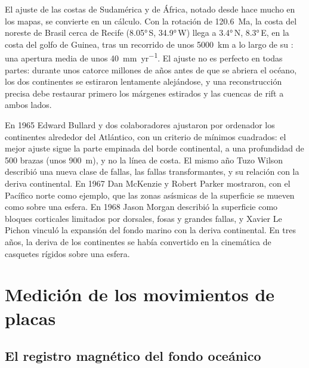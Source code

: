 El ajuste de las costas de Sudamérica y de África, notado desde hace mucho en los mapas, se convierte en un cálculo. Con la rotación de
\qty{120.6}{Ma}, la costa del noreste de Brasil cerca de Recife (\ang{8.05}\,S, \ang{34.9}\,W) llega a \ang{3.4}\,N, \ang{8.3}\,E, en la
costa del golfo de Guinea, tras un recorrido de unos \qty{5000}{km} a lo largo de su : una apertura media de unos
\qty{40}{mm.yr^{-1}}. El ajuste no es perfecto en todas partes: durante unos catorce millones de años antes de que se abriera el océano,
los dos continentes se estiraron lentamente alejándose, y una reconstrucción precisa debe restaurar primero los márgenes estirados y las
cuencas de rift a ambos lados.

\begin{history}
En 1965 Edward Bullard y dos colaboradores ajustaron por ordenador los continentes alrededor del Atlántico, con un criterio de mínimos
cuadrados: el mejor ajuste sigue la parte empinada del borde continental, a una profundidad de 500 brazas (unos \qty{900}{m}), y no la
línea de costa. El mismo año Tuzo Wilson describió una nueva clase de fallas, las fallas transformantes, y su relación con la deriva
continental. En 1967 Dan McKenzie y Robert Parker mostraron, con el Pacífico norte como ejemplo, que las zonas asísmicas de la
superficie se mueven como  sobre una esfera. En 1968 Jason Morgan describió la superficie como bloques corticales
limitados por dorsales, fosas y grandes fallas, y Xavier Le Pichon vinculó la expansión del fondo marino con la deriva continental. En
tres años, la deriva de los continentes se había convertido en la cinemática de casquetes rígidos sobre una esfera.
\end{history}

\section{Medición de los movimientos de placas}

\subsection*{El registro magnético del fondo oceánico}

